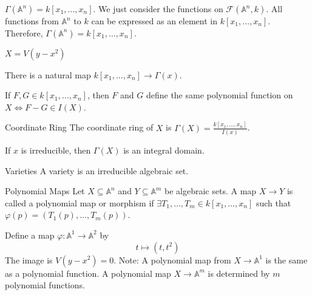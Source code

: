\documentclass{report}
\begin{document}
\begin{examples}
    \begin{example}
        $\Gamma(\mathbb{A}^{n}) = k[x_{1}, \ldots , x_{n}]$. We just consider the functions on $\mathcal{F}(\mathbb{A}^{n}, k)$. All functions from $\mathbb{A}^{n}$ to $k$ can be expressed as an element in $k[x_{1},\ldots , x_{n}]$. Therefore, $\Gamma(\mathbb{A}^{n}) = k[x_{1}, \ldots , x_{n}]$.
    \end{example}
    \begin{example}
         $X = V(y- x^{2})$
    \end{example}
\end{examples}

There is a natural map $k[x_{1}, \ldots , x_{n}] \rightarrow \Gamma(x)$.

If $F, G \in k[x_{1}, \ldots , x_{n}]$, then $F$ and $G$ define the same polynomial function on $X \iff F - G \in I(X)$.

\begin{definition}{Coordinate Ring}
    The coordinate ring of $X$ is $\Gamma(X) = \frac{k[x_{1}, \ldots , x_{n}]}{I(x)}$.
\end{definition}

If $x$ is irreducible, then $\Gamma(X)$ is an integral domain.

\begin{definition}{Varieties}
    A variety is an irreducible algebraic set.
\end{definition}

\begin{definition}{Polynomial Maps}
    Let $X \subseteq \mathbb{A}^{n}$ and $Y \subseteq \mathbb{A}^{m}$ be algebraic sets. A map $X \rightarrow Y$ is called a polynomial map or morphism if $\exists T_{1}, \ldots , T_{m} \in k[x_{1}, \ldots , x_{n}]$ such that $\varphi(p) = (T_{1}(p), \ldots , T_{m}(p))$.
\end{definition} 

\begin{examples}
    \begin{example}
        Define a map $\varphi: \mathbb{A}^{1} \rightarrow \mathbb{A}^{2}$ by
            \begin{equation*}
                t \mapsto (t, t^{2})
            \end{equation*}
        The image is $V(y - x^{2}) = 0$. Note: A polynomial map from $X \rightarrow \mathbb{A}^{1}$ is the same as a polynomial function. A polynomial map $X \rightarrow \mathbb{A}^{m}$ is determined by $m$ polynomial functions.
    \end{example}
\end{examples}
\end{document}
